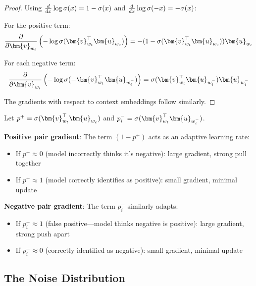 \begin{notechapter}
\begin{proof}
Using $\frac{d}{dx}\log \sigma(x) = 1 - \sigma(x)$ and $\frac{d}{dx}\log \sigma(-x) = -\sigma(x)$:

For the positive term:
\begin{equation}
\frac{\partial}{\partial \bm{v}_{w_t}}\left(-\log \sigmoid(\bm{v}_{w_t}^\top \bm{u}_{w_c})\right) = -(1 - \sigmoid(\bm{v}_{w_t}^\top \bm{u}_{w_c})) \bm{u}_{w_c}
\end{equation}

For each negative term:
\begin{equation}
\frac{\partial}{\partial \bm{v}_{w_t}}\left(-\log \sigmoid(-\bm{v}_{w_t}^\top \bm{u}_{w_i^-})\right) = \sigmoid(\bm{v}_{w_t}^\top \bm{u}_{w_i^-}) \bm{u}_{w_i^-}
\end{equation}

The gradients with respect to context embeddings follow similarly.
\end{proof}

\begin{intuition}
Let $p^+ = \sigmoid(\bm{v}_{w_t}^\top \bm{u}_{w_c})$ and $p_i^- = \sigmoid(\bm{v}_{w_t}^\top \bm{u}_{w_i^-})$.

\textbf{Positive pair gradient}: The term $(1 - p^+)$ acts as an adaptive learning rate:
\begin{itemize}
    \item If $p^+ \approx 0$ (model incorrectly thinks it's negative): large gradient, strong pull together
    \item If $p^+ \approx 1$ (model correctly identifies as positive): small gradient, minimal update
\end{itemize}

\textbf{Negative pair gradient}: The term $p_i^-$ similarly adapts:
\begin{itemize}
    \item If $p_i^- \approx 1$ (false positive---model thinks negative is positive): large gradient, strong push apart
    \item If $p_i^- \approx 0$ (correctly identified as negative): small gradient, minimal update
\end{itemize}
\end{intuition}

\subsection{The Noise Distribution}


\end{notechapter}
